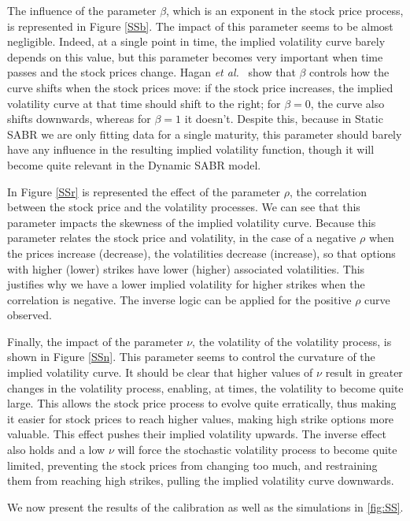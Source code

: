 The influence of the parameter $\beta$, which is an exponent in the stock price process, is represented in Figure \autoref{SSb}. The impact of this parameter seems to be almost negligible. Indeed, at a single point in time, the implied volatility curve barely depends on this value, but this parameter becomes very important when time passes and the stock prices change. Hagan \textit{et al.}~\citep{Hagan} show that $\beta$ controls how the curve shifts when the stock prices move: if the stock price increases, the implied volatility curve at that time should shift to the right; for $\beta=0$, the curve also shifts downwards, whereas for $\beta=1$ it doesn't.
Despite this, because in Static SABR we are only fitting data for a single maturity, this parameter should barely have any influence in the resulting implied volatility function, though it will become quite relevant in the Dynamic SABR model.

In Figure \autoref{SSr} is represented the effect of the parameter $\rho$, the correlation between the stock price and the volatility processes.
We can see that this parameter impacts the skewness of the implied volatility curve. Because this parameter relates the stock price and volatility, in the case of a negative $\rho$ when the prices increase (decrease), the volatilities decrease (increase), so that options with higher (lower) strikes have lower (higher) associated volatilities. This justifies why we have a lower implied volatility for higher strikes when the correlation is negative. The inverse logic can be applied for the positive $\rho$ curve observed.

Finally, the impact of the parameter $\nu$, the volatility of the volatility process, is shown in Figure \autoref{SSn}. This parameter seems to control the curvature of the implied volatility curve. It should be clear that higher values of $\nu$ result in greater changes in the volatility process, enabling, at times, the volatility to become quite large. This allows the stock price process to evolve quite erratically, thus making it easier for stock prices to reach higher values, making high strike options more valuable. This effect pushes their implied volatility upwards. The inverse effect also holds and a low $\nu$ will force the stochastic volatility process to become quite limited, preventing the stock prices from changing too much, and restraining them from reaching high strikes, pulling the implied volatility curve downwards.


We now present the results of the calibration as well as the simulations in \autoref{fig:SS}.

